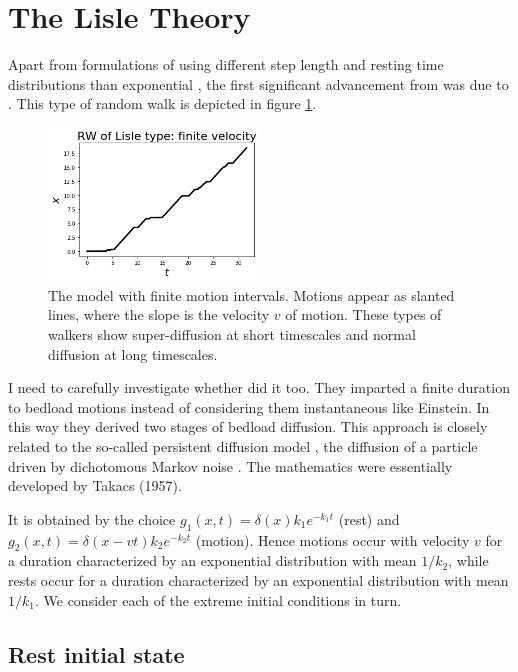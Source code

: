 \documentclass[11pt]{article}
\begin{document}
\section{The Lisle Theory}
Apart from formulations of \citet{Einstein1937} using different step length and resting time distributions than exponential \citep[e.g.][]{Sayre1965}, the first significant advancement from \citet{Einstein1937} was due to \citet{Lisle1998}.
This type of random walk is depicted in figure \ref{fig:lislewalk}.
\begin{figure}
	\centering
	\includegraphics[width=0.5\textwidth,keepaspectratio]{lisle_rw.png}
	\caption{The \citet{Lisle1998} model with finite motion intervals. Motions appear as slanted lines, where the slope is the velocity $v$ of motion. These types of walkers show super-diffusion at short timescales and normal diffusion at long timescales.}
	\label{fig:lislewalk}
\end{figure}
I need to carefully investigate whether \citet{Gordon1972} did it too.
They imparted a finite duration to bedload motions instead of considering them instantaneous like Einstein. In this way they derived two stages of bedload diffusion.
This approach is closely related to the so-called persistent diffusion model \citep{Balakrishnan1988,VanDenBroeck1990}, the diffusion of a particle driven by dichotomous Markov noise \citep[e.g.][]{Horsthemke1984,Risken1989,Bena2006}. 
The mathematics were essentially developed by Takacs (1957).

It is obtained by the choice $g_1(x,t) = \delta(x) k_1 e^{-k_1 t}$ (rest) and $g_2(x,t) = \delta(x-vt)k_2 e^{-k_2 t} $ (motion).
Hence motions occur with velocity $v$ for a duration characterized by an exponential distribution with mean $1/k_2$, while rests occur for a duration characterized by an exponential distribution with mean $1/k_1$. 
We consider each of the extreme initial conditions in turn.

\subsection{Rest initial state}
\end{document}
